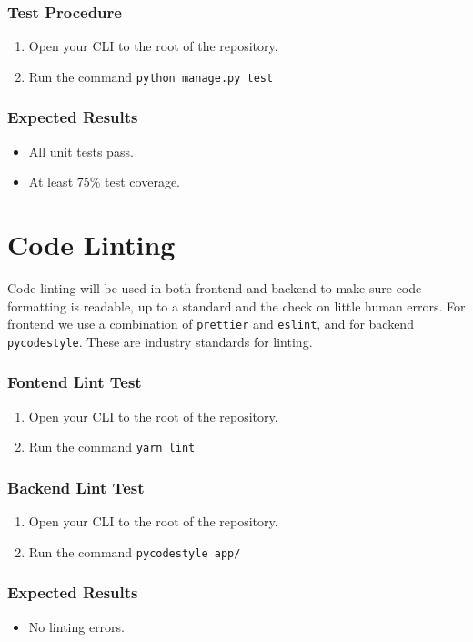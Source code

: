 \documentclass[a4paper, draft]{article}
\begin{document}
\subsubsection{Test Procedure}
\begin{enumerate}
  \item Open your CLI to the root of the repository.
  \item Run the command \texttt{python manage.py test}
\end{enumerate}

\subsubsection{Expected Results}
\begin{itemize}
  \item All unit tests pass.
  \item At least 75\% test coverage.
\end{itemize}

\newpage
\section{Code Linting}
Code linting will be used in both frontend and backend to make sure code formatting is readable, up to a standard and the check on little human errors. For frontend we use a combination of \texttt{prettier} and \texttt{eslint}, and for backend \texttt{pycodestyle}. These are industry standards for linting.
\subsubsection{Fontend Lint Test}
\begin{enumerate}
  \item Open your CLI to the root of the repository.
  \item Run the command \texttt{yarn lint}
\end{enumerate}

\subsubsection{Backend Lint Test}
\begin{enumerate}
  \item Open your CLI to the root of the repository.
  \item Run the command \texttt{pycodestyle app/}
\end{enumerate}

\subsubsection{Expected Results}
\begin{itemize}
  \item No linting errors.
\end{itemize}
\end{document}
